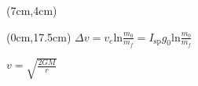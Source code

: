 \documentclass{article}
\begin{document}










\begin{textblock*}{\textwidth}(7cm,4cm)

\end{textblock*}

\begin{textblock*}{\textwidth}(0cm,17.5cm) %
\centering %
\Large 
$\Delta v = v_e \text{ln} \frac{m_0}{m_f}=I_{\text{sp}} g_0 \text{ln}\frac{m_0}{m_f}$

\vspace{10pt} %

$v = \sqrt{\frac{2GM}{r}}$
\end{textblock*}
\end{document}
